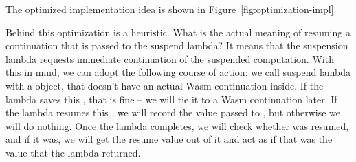 The optimized implementation idea is shown in Figure~\ref{fig:optimization-impl}.

Behind this optimization is a heuristic. What is the actual meaning of resuming a continuation
that is passed to the suspend lambda? It means that the suspension lambda requests immediate continuation of the suspended computation.
With this in mind, we can adopt the following course of action: we call suspend lambda with
a \WasmContinuation object, that doesn't have an actual Wasm continuation inside. If the lambda
saves this \WasmContinuation, that is fine – we will tie it to a Wasm continuation later.
If the lambda resumes this \WasmContinuation, we will record the value passed to
\resumeWith, but otherwise we will do nothing. Once the lambda completes, we will check whether
\WasmContinuation was resumed, and if it was, we will get the resume value out of it and act
as if that was the value that the lambda returned.
